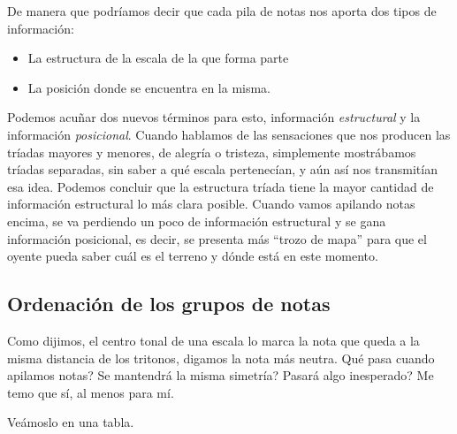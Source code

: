 \documentclass[]{article}
\providecommand{\tightlist}{%
  \setlength{
\itemsep}{0pt}\setlength{\parskip}{0pt}}
\begin{document}
  De manera que podríamos decir que cada pila de notas nos aporta dos tipos de información:
  
  \begin{itemize}   
    \tightlist
    \item La estructura de la escala de la que forma parte
    \item La posición donde se encuentra en la misma.
  \end{itemize}
  
  Podemos acuñar dos nuevos términos para esto, información \emph{estructural} y la información \emph{posicional}. Cuando hablamos de las sensaciones que nos producen las tríadas mayores y menores, de alegría o tristeza, simplemente mostrábamos tríadas separadas, sin saber a qué escala pertenecían, y aún así nos transmitían esa idea. Podemos concluir que la estructura tríada tiene la mayor cantidad de información estructural lo más clara posible. Cuando vamos apilando notas encima, se va perdiendo un poco de información estructural y se gana información posicional, es decir, se presenta más ``trozo de mapa'' para que el oyente pueda saber cuál es el terreno y dónde está en este momento.
  
  \subsection{Ordenación de los grupos de notas}
  
  Como dijimos, el centro tonal de una escala lo marca la nota que queda a la misma distancia de los tritonos, digamos la nota más neutra. Qué pasa cuando apilamos notas? Se mantendrá la misma simetría? Pasará algo inesperado? Me temo que sí, al menos para mí.
  
  Veámoslo en una tabla.
  
  
\end{document}
